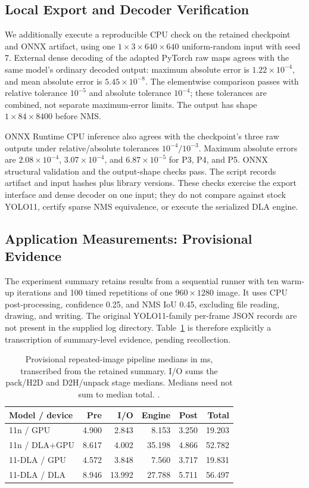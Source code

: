 \subsection{Local Export and Decoder Verification}
\label{sec:parity}
We additionally execute a reproducible CPU check on the retained checkpoint and
ONNX artifact, using one $1\times3\times640\times640$ uniform-random input
with seed 7. External dense decoding of the adapted PyTorch raw maps agrees
with the same model's ordinary decoded output: maximum absolute error is
$1.22\times10^{-4}$, and mean absolute error is $5.45\times10^{-8}$. The
elementwise comparison passes with relative tolerance $10^{-5}$ and absolute
tolerance $10^{-4}$; these tolerances are combined, not separate maximum-error
limits. The output has shape $1\times84\times8400$ before NMS.

ONNX Runtime CPU inference also agrees with the checkpoint's three raw outputs
under relative/absolute tolerances $10^{-4}/10^{-3}$. Maximum absolute errors
are $2.08\times10^{-4}$, $3.07\times10^{-4}$, and $6.87\times10^{-5}$ for
P3, P4, and P5. ONNX structural validation and the output-shape checks pass.
The script records artifact and input hashes plus library versions. These
checks exercise the export interface and dense decoder on one input; they
do not compare against stock YOLO11, certify sparse NMS equivalence, or execute
the serialized DLA engine.

\subsection{Application Measurements: Provisional Evidence}
\label{sec:application}
The experiment summary retains results from a sequential runner with ten warm-up
iterations and 100 timed repetitions of one $960\times1280$ image. It uses
CPU post-processing, confidence 0.25, and NMS IoU 0.45, excluding file reading,
drawing, and writing. The original YOLO11-family per-frame JSON records are not
present in the supplied log directory. Table~\ref{tab:e2e} is therefore
explicitly a transcription of summary-level evidence, pending recollection.

\begin{table}[t]
\caption{Provisional repeated-image pipeline medians in ms, transcribed from the
retained summary. I/O sums the pack/H2D and D2H/unpack stage medians. Medians need not
sum to median total. .}
\label{tab:e2e}\centering\footnotesize
\setlength{\tabcolsep}{3pt}
\begin{tabular}{lrrrrr}
\toprule
Model / device & Pre & I/O & Engine & Post & Total \\
\midrule
11n / GPU & 4.900 & 2.843 & 8.153 & 3.250 & 19.203 \\
11n / DLA+GPU & 8.617 & 4.002 & 35.198 & 4.866 & 52.782 \\
11-DLA / GPU & 4.572 & 3.848 & 7.560 & 3.717 & 19.831 \\
11-DLA / DLA & 8.946 & 13.992 & 27.788 & 5.711 & 56.497 \\
\bottomrule
\end{tabular}
\end{table}

